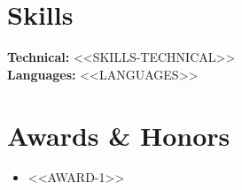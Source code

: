 \documentclass[10pt,a4paper]{article}
\begin{document}
\section{Skills}
\textbf{Technical:} <<SKILLS-TECHNICAL>>\\[2pt]
\textbf{Languages:} <<LANGUAGES>>

\section{Awards \& Honors}
\begin{itemize}
  \item <<AWARD-1>>
\end{itemize}
\end{document}
